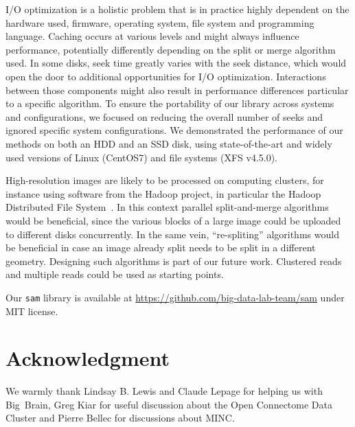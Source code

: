 \documentclass[10pt, conference, compsocconf]{IEEEtran}
\begin{document}
I/O optimization is a holistic problem that is in practice highly
dependent on the hardware used, firmware, operating system, file
system and programming language. Caching occurs at various levels and
might always influence performance, potentially differently depending
on the split or merge algorithm used. In some disks, seek time greatly
varies with the seek distance, which would open the door to additional
opportunities for I/O optimization. Interactions between those
components might also result in performance differences particular to
a specific algorithm. To ensure the portability of our library
across systems and configurations, we focused on reducing the overall
number of seeks and ignored specific system configurations. We
demonstrated the performance of our methods on both an HDD and an SSD
disk, using state-of-the-art and widely used versions of Linux
(CentOS7) and file systems (XFS v4.5.0).


High-resolution images are likely to be processed on computing
clusters, for instance using software from the Hadoop project, in
particular the Hadoop Distributed File
System~\cite{shvachko2010hadoop}. In this context parallel
split-and-merge algorithms would be beneficial, since the various
blocks of a large image could be uploaded to different disks
concurrently. In the same vein, ``re-spliting'' algorithms would be
beneficial in case an image already split needs to be split in a
different geometry. Designing such algorithms is part of our future
work. Clustered reads and multiple reads could be used as starting
points.

Our \texttt{sam} library is available at
\url{https://github.com/big-data-lab-team/sam} under MIT license.


\section*{Acknowledgment}
We warmly thank Lindsay B. Lewis and Claude Lepage for helping us with
Big~Brain, Greg Kiar for useful discussion about the Open Connectome
Data Cluster and Pierre Bellec for discussions about MINC.



\end{document}

